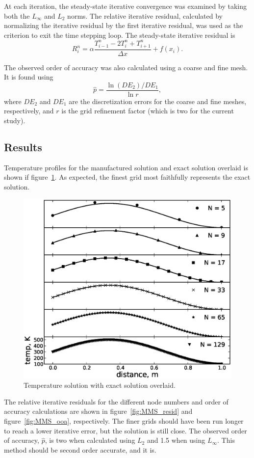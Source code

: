 \documentclass[11pt, letterpaper]{article}
\newcommand{\fig}[1]{figure~\ref{#1}}
\begin{document}
At each iteration, the steady-state iterative convergence was examined by taking both the $L_\infty$ and
$L_2$ norms.  The relative iterative residual, calculated by normalizing the iterative
residual by the first iterative residual, was used as the criterion to exit the time
stepping loop.  The steady-state iterative residual is
%
\begin{equation}
	\label{eqn:ss_iter_resid}
	R_i^n = \alpha \frac{T_{i-1}^n - 2T_i^n + T_{i+1}^n}{\Delta x} + f(x_i).
\end{equation}

The observed order of accuracy was also calculated using a coarse and fine mesh.  It
is found using
%
\begin{equation}
	\label{eqn:phat}
	\hat{p} = \frac{\ln(DE_2) / DE_1}{\ln r},
\end{equation}
%
where $DE_2$ and $DE_1$ are the discretization errors for the coarse and fine meshes, respectively,
and $r$ is the grid refinement factor (which is two for the current study).


\subsection{Results}

Temperature profiles for the manufactured solution and exact solution overlaid is shown
if \fig{fig:MMS_profile}.  As expected, the finest grid most faithfully represents the
exact solution.

\begin{figure}
	\centering
	\includegraphics[width=.6\textwidth]{./figs/MMS_profiles.eps}
	\caption{Temperature solution with exact solution overlaid.}
	\label{fig:MMS_profile}
\end{figure}

The relative iterative residuals for the different node numbers and order
of accuracy calculations are shown in \fig{fig:MMS_resid} and \fig{fig:MMS_ooa},
respectively.  The finer grids should have been run longer to reach a lower
iterative error, but the solution is still close.  The observed order of accuracy,
$\hat{p}$, is two when calculated using $L_2$ and 1.5 when using $L_\infty$.  This
method should be second order accurate, and it is.
\end{document}
